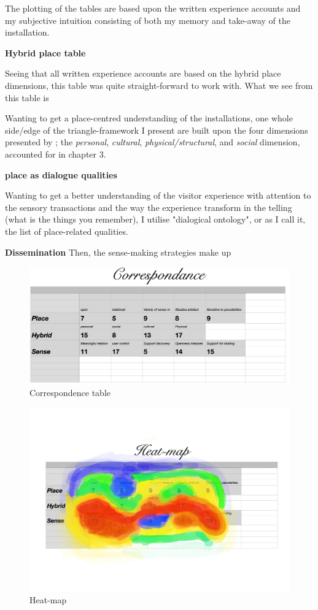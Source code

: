 The plotting of the tables are based upon the written experience accounts and my subjective intuition consisting of both my memory and take-away of the installation. 

\textbf{Hybrid place table}

Seeing that all written experience accounts are based on the hybrid place dimensions, this table was quite straight-forward to work with. What we see from this table is 

Wanting to get a place-centred understanding of the installations, one whole side/edge of the triangle-framework I present are built upon the four dimensions presented by \autocite{hybridplace_ciolfi}; the \emph{personal}, \emph{cultural}, \emph{physical/structural}, and \emph{social} dimension, accounted for in chapter 3.



\textbf{place as dialogue qualities}

Wanting to get a better understanding of the visitor experience with attention to the sensory transactions and the way the experience transform in the telling (what is the things you remember), I utilise \autocite{spaceplace_ciolfi} "dialogical ontology", or as I call it, the list of place-related qualities. 

\textbf{Dissemination}
Then, the sense-making strategies make up



\begin{figure}[H]
\includegraphics[width=12.5cm]{pictures/analysis/correspondance.png}
\caption{Correspondence table}
\centering 
\end{figure}

\begin{figure}[H]
\includegraphics[width=12.5cm]{pictures/analysis/heatmap.png}
\caption{Heat-map}
\centering 
\end{figure}

